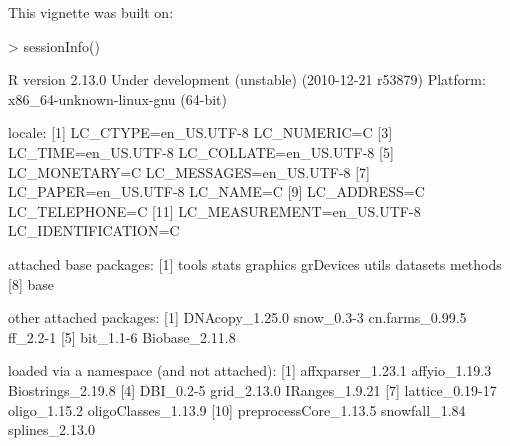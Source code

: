 \documentclass[article]{bioinf}
\begin{document}
This vignette was built on:
\begin{Schunk}
\begin{Sinput}
> sessionInfo()
\end{Sinput}
\begin{Soutput}
R version 2.13.0 Under development (unstable) (2010-12-21 r53879)
Platform: x86_64-unknown-linux-gnu (64-bit)

locale:
 [1] LC_CTYPE=en_US.UTF-8       LC_NUMERIC=C              
 [3] LC_TIME=en_US.UTF-8        LC_COLLATE=en_US.UTF-8    
 [5] LC_MONETARY=C              LC_MESSAGES=en_US.UTF-8   
 [7] LC_PAPER=en_US.UTF-8       LC_NAME=C                 
 [9] LC_ADDRESS=C               LC_TELEPHONE=C            
[11] LC_MEASUREMENT=en_US.UTF-8 LC_IDENTIFICATION=C       

attached base packages:
[1] tools     stats     graphics  grDevices utils     datasets  methods  
[8] base     

other attached packages:
[1] DNAcopy_1.25.0  snow_0.3-3      cn.farms_0.99.5 ff_2.2-1       
[5] bit_1.1-6       Biobase_2.11.8 

loaded via a namespace (and not attached):
 [1] affxparser_1.23.1     affyio_1.19.3         Biostrings_2.19.8    
 [4] DBI_0.2-5             grid_2.13.0           IRanges_1.9.21       
 [7] lattice_0.19-17       oligo_1.15.2          oligoClasses_1.13.9  
[10] preprocessCore_1.13.5 snowfall_1.84         splines_2.13.0       
\end{Soutput}
\end{Schunk}




\end{document}
